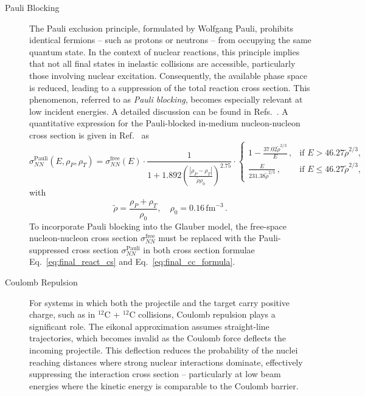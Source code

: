 \begin{description}

\item[Pauli Blocking]
The Pauli exclusion principle, formulated by Wolfgang Pauli, prohibits identical fermions -- such as protons or neutrons -- from occupying the same quantum state. In the context of nuclear reactions, this principle implies that not all final states in inelastic collisions are accessible, particularly those involving nuclear excitation. Consequently, the available phase space is reduced, leading to a suppression of the total reaction cross section.
This phenomenon, referred to as \textit{Pauli blocking}, becomes especially relevant at low incident energies. A detailed discussion can be found in Refs.~\cite{hussein1991microscopic, bertulani1986heavy, bertulani2001density, bertulani2010pauli}. A quantitative expression for the Pauli-blocked in-medium nucleon-nucleon cross section is given in Ref.~\cite{teixeira2022nuclear} as
\begin{equation}\label{eq:pauli_blocked_cs}
\sigma_{NN}^{\text{Pauli}}(E, \rho_P, \rho_T) = \sigma_{NN}^{\text{free}}(E)
\cdot \frac{1}{1 + 1.892 \left( \frac{|\rho_P - \rho_T|}{\tilde{\rho} \rho_0} \right)^{2.75}}
\cdot
\begin{cases}
1 - \frac{37.02 \tilde{\rho}^{2/3}}{E} \, , & \text{if } E > 46.27 \tilde{\rho}^{2/3}, \\
\frac{E}{231.38 \tilde{\rho}^{2/3}} \, , & \text{if } E \leq 46.27 \tilde{\rho}^{2/3},
\end{cases}
\end{equation}
with
\[
\tilde{\rho} = \frac{\rho_P + \rho_T}{\rho_0}, \quad \rho_0 = 0.16\,\mathrm{fm}^{-3} \, .
\]
To incorporate Pauli blocking into the Glauber model, the free-space nucleon-nucleon cross section $\sigma_{NN}^{\text{free}}$ must be replaced with the Pauli-suppressed cross section $\sigma_{NN}^{\text{Pauli}}$ in both cross section formulae Eq.~\ref{eq:final_react_cs} and Eq.~\ref{eq:final_cc_formula}. 
\item[Coulomb Repulsion]
For systems in which both the projectile and the target carry positive charge, such as in $^{12}$C + $^{12}$C collisions, Coulomb repulsion plays a significant role. The eikonal approximation assumes straight-line trajectories, which becomes invalid as the Coulomb force deflects the incoming projectile. This deflection reduces the probability of the nuclei reaching distances where strong nuclear interactions dominate, effectively suppressing the interaction cross section -- particularly at low beam energies where the kinetic energy is comparable to the Coulomb barrier.

\end{description}
